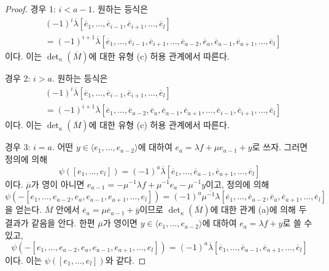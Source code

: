 \begin{proof}
\medskip\noindent
경우 1: $i < a - 1$. 원하는 등식은
\begin{align*}
& (-1)^i
\overline{\lambda}
[\overline{e}_1,
\ldots,
\overline{e}_{i - 1},
\overline{e}_{i + 1},
\ldots,
\overline{e}_l] \\
& =
(-1)^{i + 1}
\overline{\lambda}
[\overline{e}_1,
\ldots,
\overline{e}_{i - 1},
\overline{e}_{i + 1},
\ldots,
\overline{e}_{a - 2},
\overline{e}_a,
\overline{e}_{a - 1},
\overline{e}_{a + 1},
\ldots,
\overline{e}_l]
\end{align*}
이다. 이는 $\det_\kappa(\overline{M})$에 대한 유형 (c) 허용 관계에서
따른다.

\medskip\noindent
경우 2: $i > a$. 원하는 등식은
\begin{align*}
& (-1)^i
\overline{\lambda}
[\overline{e}_1,
\ldots,
\overline{e}_{i - 1},
\overline{e}_{i + 1},
\ldots,
\overline{e}_l] \\
& =
(-1)^{i + 1}
\overline{\lambda}
[\overline{e}_1,
\ldots,
\overline{e}_{a - 2},
\overline{e}_a,
\overline{e}_{a - 1},
\overline{e}_{a + 1},
\ldots,
\overline{e}_{i - 1},
\overline{e}_{i + 1},
\ldots,
\overline{e}_l]
\end{align*}
이다. 이는 $\det_\kappa(\overline{M})$에 대한 유형 (c) 허용 관계에서
따른다.

\medskip\noindent
경우 3: $i = a$. 어떤
$y \in \langle e_1, \ldots, e_{a - 2}\rangle$에 대하여
$e_a = \lambda f + \mu e_{a - 1} + y$로 쓰자. 그러면 정의에 의해
$$
\psi([e_1, \ldots, e_l]) =
(-1)^a
\overline{\lambda}
[\overline{e}_1,
\ldots,
\overline{e}_{a - 1},
\overline{e}_{a + 1},
\ldots,
\overline{e}_l]
$$
이다. $\overline{\mu}$가 영이 아니면
$e_{a - 1} = - \mu^{-1} \lambda f + \mu^{-1}e_a - \mu^{-1} y$이고,
정의에 의해
$$
\psi(-[e_1, \ldots, e_{a - 2}, e_a, e_{a - 1}, e_{a + 1}, \ldots, e_l]) =
(-1)^a
\overline{\mu^{-1}\lambda}
[\overline{e}_1,
\ldots,
\overline{e}_{a - 2},
\overline{e}_a,
\overline{e}_{a + 1},
\ldots,
\overline{e}_l]
$$
을 얻는다. $\overline{M}$ 안에서
$\overline{e}_a = \mu \overline{e}_{a - 1} + \overline{y}$이므로
$\det_\kappa(\overline{M})$에 대한 관계 (a)에 의해 두 결과가 같음을
안다. 한편 $\overline{\mu}$가 영이면
$y \in \langle e_1, \ldots, e_{a - 2}\rangle$에 대하여
$e_a = \lambda f + y$로 쓸 수 있고,
$$
\psi(-[e_1, \ldots, e_{a - 2}, e_a, e_{a - 1}, e_{a + 1}, \ldots, e_l]) =
(-1)^a
\overline{\lambda}
[\overline{e}_1,
\ldots,
\overline{e}_{a - 1},
\overline{e}_{a + 1},
\ldots,
\overline{e}_l]
$$
이다. 이는 $\psi([e_1, \ldots, e_l])$와 같다.


\end{proof}
